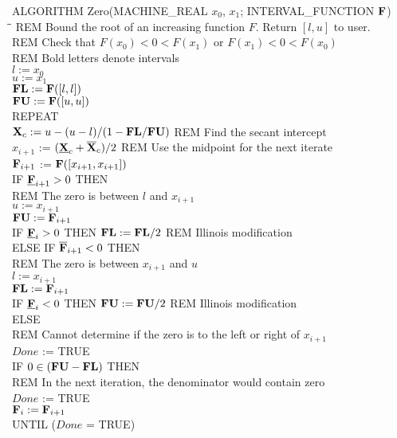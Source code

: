 \begin{tabbing}
ALGORITHM Zero(MACHINE\_REAL $x_0$, $x_1$; INTERVAL\_FUNCTION ${\bf F}$) \\
\qquad \= \qquad \= \qquad \kill 
REM Bound the root of an increasing function $F$.  Return $[l,u]$ to user. \\
REM Check that $F(x_0) < 0 < F(x_1)$ or $F(x_1) < 0 < F(x_0)$ \\
REM Bold letters denote intervals \\
$l := x_0$ \\
$u := x_1$ \\
${\bf FL} := {\bf F}([l,l])$ \\
${\bf FU} := {\bf F}([u,u])$ \\

REPEAT \\
\> ${\bf X}_c := u - (u-l)/(1-{\bf FL}/{\bf FU})$ 
   \quad REM Find the secant intercept\\
\> $x_{i+1}$ := $(\underline{{\bf X}}_c + \overline{{\bf X}}_c) / 2$  \quad
REM Use the midpoint for the next iterate  \\
\> ${\bf F}_{i+1}$ := ${\bf F}([x_{i+1},x_{i+1}])$    \\
\> IF $\underline{{\bf F}}_{i+1} > 0 $ THEN  \\
\> \> REM The zero is between $l$ and $x_{i+1}$ \\
\> \> $ u := x_{i+1}  $  \\
\> \> $ {\bf FU} := {\bf F}_{i+1} $    \\
\> \> IF $\underline{{\bf F}}_i > 0$  THEN  ${\bf FL} := {\bf FL} / 2 $  
        \quad REM Illinois modification  \\
\> ELSE IF $\overline{{\bf F}}_{i+1} < 0 $ THEN   \\
\> \> REM The zero is between $x_{i+1}$ and $u$ \\
\> \> $ l := x_{i+1} $   \\
\> \> $ {\bf FL} := {\bf F}_{i+1} $    \\
\> \> IF $\underline{{\bf F}}_i < 0$ THEN $ {\bf FU} := {\bf FU} / 2 $   
        \quad REM Illinois modification  \\
\> ELSE    \\
\> \> REM Cannot determine if the zero is to the left or 
         right of $x_{i+1}$ \\
\> \> $Done$ := TRUE    \\
\> IF $ 0 \in ({\bf FU} - {\bf FL}) $ THEN \\
\> \> REM In the next iteration, the denominator would contain zero \\
\> \> $Done$ := TRUE \\
\> ${\bf F}_i := {\bf F}_{i+1} $ \\
UNTIL ($Done$ = TRUE) \\


\end{tabbing}
